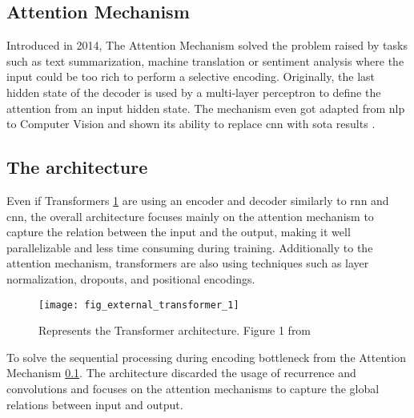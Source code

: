 \subsection{Attention Mechanism}
\label{nlp:attention}
Introduced in 2014, The Attention Mechanism \autocite{paper:bahdanau2014neural} solved the problem raised by tasks such as text summarization, machine translation or sentiment analysis where the input could be too rich to perform a selective encoding. Originally, the last hidden state of the decoder is used by a multi-layer perceptron to define the attention from an input hidden state. The mechanism even got adapted from \gls{nlp} to Computer Vision and shown its ability to replace \gls{cnn} with \gls{sota} results \autocite{paper:journals/corr/abs-1906-05909}.

\subsection{The architecture}
Even if Transformers \ref{fig:fig_external_transformer_1} are using an encoder and decoder similarly to \gls{rnn} and \gls{cnn}, the overall architecture focuses mainly on the attention mechanism to capture the relation between the input and the output, making it well parallelizable and less time consuming during training. Additionally to the attention mechanism, transformers are also using techniques such as layer normalization, dropouts, and positional encodings.

\begin{figure}[H]
    \centering
    \texttt{[image: fig\_external\_transformer\_1]}
    \caption{Represents the Transformer architecture. Figure 1 from \autocite{paper:journals/corr/VaswaniSPUJGKP17}}
    \label{fig:fig_external_transformer_1}
\end{figure}



 To solve the sequential processing during encoding bottleneck from the Attention Mechanism \ref{nlp:attention}. The architecture discarded the usage of recurrence and convolutions and focuses on the attention mechanisms to capture the global relations between input and output.



